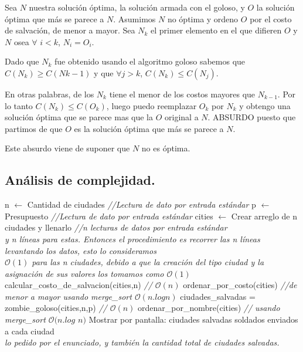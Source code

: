 Sea $N$ nuestra solución óptima, la solución armada con el goloso, y $O$ la solución óptima que más se parece a $N$. Asumimos $N$ no óptima y ordeno $O$ por el costo de salvación, de menor a mayor.
Sea $N_{k}$ el primer elemento en el que difieren $O$ y $N$ osea $\forall$ $i<k$, $N_{i}=O_{i}$.

Dado que $N_{k}$ fue obtenido usando el algoritmo goloso sabemos que $C(N_{k}) \geq C(N{k-1})$ y que $\forall j>k$, $C(N_{k})\leq C(N_{j})$.

En otras palabras, de los $N_{k}$ tiene el menor de los costos mayores que $N_{k-1}$. Por lo tanto $C(N_{k})\leq C(O_{k})$, luego puedo reemplazar $O_{k}$ por $N_{k}$ y obtengo una solución óptima que se parece mas que la $O$ original a $N$. ABSURDO puesto que partimos de que $O$ es la solución óptima que más se parece a $N$.

Este absurdo viene de suponer que $N$ no es óptima.





\newpage
\subsection{Análisis de complejidad.}

\vspace*{0.3cm}

\begin{codebox}
\li n $\leftarrow$ Cantidad de ciudades {\it //Lectura de dato por entrada estándar}
\li p $\leftarrow$ Presupuesto {\it //Lectura de dato por entrada estándar}
\li cities $\leftarrow$ Crear arreglo de n ciudades y llenarlo {\it //n lecturas de datos por entrada estándar}
\\ {\it y n líneas para estas. Entonces el procedimiento es recorrer las n líneas levantando los datos, esto lo consideramos}\\ {\it $\mathcal{O}(1)$ para las n ciudades, debido a que la creación del tipo ciudad y la asignación de sus valores los tomamos como $\mathcal{O}(1)$}
\li calcular_costo_de_salvacion(cities,n) {\it // $\mathcal{O}(n)$}
\li ordenar_por_costo(cities) {\it //de menor a mayor usando merge_sort $\mathcal{O}(n.log n)$}
\li ciudades_salvadas = zombie_goloso(cities,n,p) {\it // $\mathcal{O}(n)$}
\li ordenar_por_nombre(cities) {\it // usando merge_sort $\mathcal{O}(n.log$ $n)$}
\li Mostrar por pantalla: ciudades salvadas
\li                       soldados enviados a cada ciudad
\\{\it lo pedido por el enunciado, y también la cantidad total de ciudades salvadas.}
\end{codebox}

